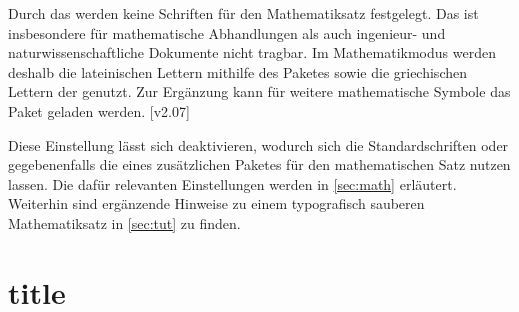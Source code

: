 \documentclass[english,ngerman,ttfont=roboto,ToDo=inline,final]{tudscrmanual207}
\begin{document}
%
Durch das \CD werden keine Schriften für den Mathematiksatz festgelegt. Das ist 
insbesondere für mathematische Abhandlungen als auch ingenieur- und 
naturwissenschaftliche Dokumente nicht tragbar. Im Mathematikmodus werden 
deshalb die lateinischen Lettern mithilfe des Paketes 
sowie die griechischen Lettern der \OpenSans genutzt. Zur Ergänzung kann für 
weitere mathematische Symbole das Paket  geladen werden.
[v2.07]

Diese Einstellung lässt sich deaktivieren, wodurch sich die Standardschriften 
oder gegebenenfalls die eines zusätzlichen Paketes für den mathematischen Satz 
nutzen lassen. Die dafür relevanten Einstellungen werden in \autoref{sec:math} 
erläutert. Weiterhin sind ergänzende Hinweise zu einem typografisch sauberen
Mathematiksatz in \autoref{sec:tut} zu finden.

\section{title}


\end{document}
